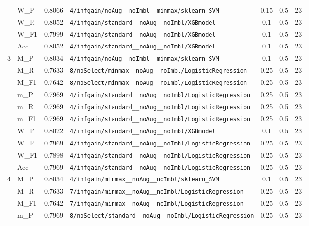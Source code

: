\begin{table}[htbp]
\begin{tabular}{|c|l|c|>{\ttfamily\footnotesize}p{7.2cm}|c|c|c|}
 & W\_P & 0.8066 & \texttt{4/infgain/noAug\_\_noImbl\_\_minmax/sklearn\_SVM} & 0.15 & 0.5  & 23 \\ 
 & W\_R & 0.8052 & \texttt{4/infgain/standard\_\_noAug\_\_noImbl/XGBmodel} & 0.1 & 0.5  & 23 \\ 
 & W\_F1 & 0.7999 & \texttt{4/infgain/standard\_\_noAug\_\_noImbl/XGBmodel} & 0.1 & 0.5  & 23 \\ 
 & Acc & 0.8052 & \texttt{4/infgain/standard\_\_noAug\_\_noImbl/XGBmodel} & 0.1 & 0.5  & 23 \\ 
\hline
\multirow{10}{*}{3} & M\_P & 0.8034 & \texttt{4/infgain/noAug\_\_noImbl\_\_minmax/sklearn\_SVM} & 0.1 & 0.5  & 23 \\ 
 & M\_R & 0.7633 & \texttt{8/noSelect/minmax\_\_noAug\_\_noImbl/LogisticRegression} & 0.25 & 0.5  & 23 \\ 
 & M\_F1 & 0.7642 & \texttt{8/noSelect/minmax\_\_noAug\_\_noImbl/LogisticRegression} & 0.25 & 0.5  & 23 \\ 
 & m\_P & 0.7969 & \texttt{4/infgain/standard\_\_noAug\_\_noImbl/LogisticRegression} & 0.25 & 0.5  & 23 \\ 
 & m\_R & 0.7969 & \texttt{4/infgain/standard\_\_noAug\_\_noImbl/LogisticRegression} & 0.25 & 0.5  & 23 \\ 
 & m\_F1 & 0.7969 & \texttt{4/infgain/standard\_\_noAug\_\_noImbl/LogisticRegression} & 0.25 & 0.5  & 23 \\ 
 & W\_P & 0.8022 & \texttt{4/infgain/standard\_\_noAug\_\_noImbl/XGBmodel} & 0.1 & 0.5  & 23 \\ 
 & W\_R & 0.7969 & \texttt{4/infgain/standard\_\_noAug\_\_noImbl/LogisticRegression} & 0.25 & 0.5  & 23 \\ 
 & W\_F1 & 0.7898 & \texttt{4/infgain/standard\_\_noAug\_\_noImbl/LogisticRegression} & 0.25 & 0.5  & 23 \\ 
 & Acc & 0.7969 & \texttt{4/infgain/standard\_\_noAug\_\_noImbl/LogisticRegression} & 0.25 & 0.5  & 23 \\ 
\hline
\multirow{10}{*}{4} & M\_P & 0.8034 & \texttt{4/infgain/minmax\_\_noAug\_\_noImbl/sklearn\_SVM} & 0.1 & 0.5  & 23 \\ 
 & M\_R & 0.7633 & \texttt{7/infgain/minmax\_\_noAug\_\_noImbl/LogisticRegression} & 0.25 & 0.5  & 23 \\ 
 & M\_F1 & 0.7642 & \texttt{7/infgain/minmax\_\_noAug\_\_noImbl/LogisticRegression} & 0.25 & 0.5  & 23 \\ 
 & m\_P & 0.7969 & \texttt{8/noSelect/standard\_\_noAug\_\_noImbl/LogisticRegression} & 0.25 & 0.5  & 23 \\ 

\end{tabular}
\end{table}
